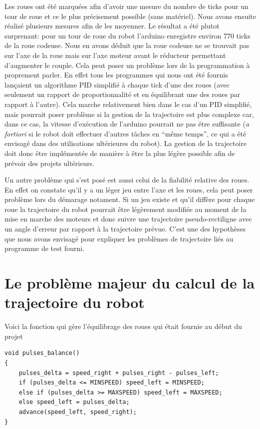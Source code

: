 \documentclass[a4paper]{report}
\begin{document}
Les roues ont été marquées afin d'avoir une mesure du nombre de ticks pour un tour de roue et ce le plus précisement possible (sans matériel).
Nous avons ensuite réalisé plusieurs mesures afin de les moyenner.
Le résultat a été plutot surprenant: pour un tour de roue du robot l'arduino enregistre environ 770 ticks de la roue codeuse.
Nous en avons déduit que la roue codeuse ne se trouvait pas sur l'axe de la roue mais sur l'axe moteur avant le réducteur permettant d'augmenter le couple.
Cela peut poser un problème lors de la programmation à proprement parler.
En effet tous les programmes qui nous ont été fournis lançaient un algorithme PID simplifié à chaque tick d'une des roues (avec seulement un rapport de proportionnalité et en équilibrant une des roues par rapport à l'autre).
Cela marche relativement bien dans le cas d'un PID simplifié, mais pourrait poser problème si la gestion de la trajectoire est plus complexe car, dans ce cas, la vitesse d'exécution de l'arduino pourrait ne pas étre suffisante (\emph{a fortiori} si le robot doit effectuer d'autres tâches en ``même temps'', ce qui a été envisagé dans des utilisations ultérieures du robot).
La gestion de la trajectoire doit donc être implémentée de manière à être la plus légère possible afin de prévoir des projets ultérieurs.

Un autre problème qui s'est posé est aussi celui de la fiabilité relative des roues.
En effet on constate qu'il y a un léger jeu entre l'axe et les roues, cela peut poser problème lors du démarage notament.
Si un jeu existe et qu'il diffère pour chaque roue la trajectoire du robot pourrait être légèrement modifiée au moment de la mise en marche des moteurs et donc suivre une trajectoire pseudo-rectiligne avec un angle d'erreur par rapport à la trajectoire prévue. C'est une des hypothèses que nous avons envisagé pour expliquer les problèmes de trajectoire liés au programme de test fourni.


\section{Le problème majeur du calcul de la trajectoire du robot%
  \label{le-probleme-majeur-du-calcul-de-la-trajectoire-du-robot}%
}

Voici la fonction qui gère l'équilibrage des roues qui était fournie au début du projet

\begin{verbatim}
void pulses_balance() 
{ 
    pulses_delta = speed_right + pulses_right - pulses_left; 
    if (pulses_delta <= MINSPEED) speed_left = MINSPEED; 
    else if (pulses_delta >= MAXSPEED) speed_left = MAXSPEED; 
    else speed_left = pulses_delta; 
    advance(speed_left, speed_right); 
} 
\end{verbatim}
\end{document}
